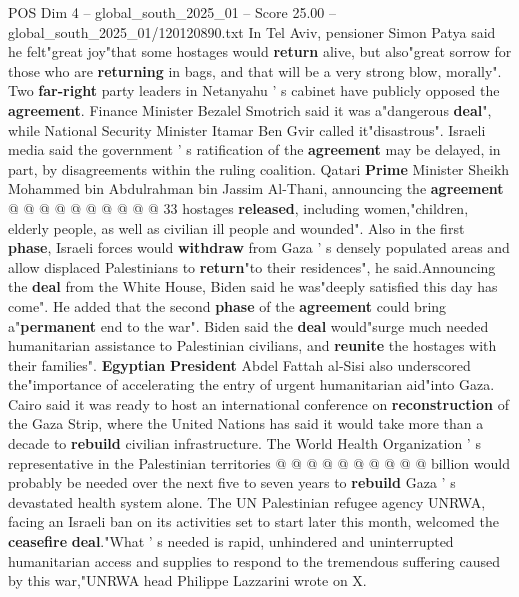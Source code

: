 \begin{textsample}{POS Dim 4 – global\_south\_2025\_01 – Score 25.00 – global\_south\_2025\_01/120120890.txt}
In Tel Aviv, pensioner Simon Patya said he felt"great joy"that some hostages would \textbf{return} alive, but also"great sorrow for those who are \textbf{returning} in bags, and that will be a very strong blow, morally".
Two \textbf{far-right} party leaders in Netanyahu ' s cabinet have publicly opposed the \textbf{agreement}.
Finance Minister Bezalel Smotrich said it was a"dangerous \textbf{deal}", while National Security Minister Itamar Ben Gvir called it"disastrous".
Israeli media said the government ' s ratification of the \textbf{agreement} may be delayed, in part, by disagreements within the ruling coalition.
Qatari \textbf{Prime} Minister Sheikh Mohammed bin Abdulrahman bin Jassim Al-Thani, announcing the \textbf{agreement} @ @ @ @ @ @ @ @ @ @ 33 hostages \textbf{released}, including women,"children, elderly people, as well as civilian ill people and wounded".
Also in the first \textbf{phase}, Israeli forces would \textbf{withdraw} from Gaza ' s densely populated areas and allow displaced Palestinians to \textbf{return}"to their residences", he said.Announcing the \textbf{deal} from the White House, Biden said he was"deeply satisfied this day has come".
He added that the second \textbf{phase} of the \textbf{agreement} could bring a"\textbf{permanent} end to the war".
Biden said the \textbf{deal} would"surge much needed humanitarian assistance to Palestinian civilians, and \textbf{reunite} the hostages with their families". \textbf{Egyptian} \textbf{President} Abdel Fattah al-Sisi also underscored the"importance of accelerating the entry of urgent humanitarian aid"into Gaza.
Cairo said it was ready to host an international conference on \textbf{reconstruction} of the Gaza Strip, where the United Nations has said it would take more than a decade to \textbf{rebuild} civilian infrastructure.
The World Health Organization ' s representative in the Palestinian territories @ @ @ @ @ @ @ @ @ @ billion would probably be needed over the next five to seven years to \textbf{rebuild} Gaza ' s devastated health system alone.
The UN Palestinian refugee agency UNRWA, facing an Israeli ban on its activities set to start later this month, welcomed the \textbf{ceasefire} \textbf{deal}."What ' s needed is rapid, unhindered and uninterrupted humanitarian access and supplies to respond to the tremendous suffering caused by this war,"UNRWA head Philippe Lazzarini wrote on X.

\end{textsample}
